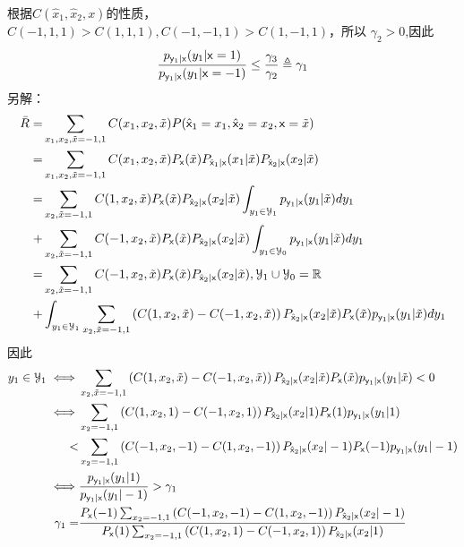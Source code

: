\documentclass[a4paper]{article}
\begin{document}
\begin{enumerate}[label=\thehwcnt.\arabic*.]
\begin{enumerate}[label=(\alph*)]
    根据$C(\hat{x}_1,\hat{x}_2,x)$的性质，
    $C(-1,1,1)>C(1,1,1),C(-1,-1,1)>C(1,-1,1)$，所以
    $\gamma_2>0$,因此
    \[
     \frac{p_{\mathsf{y}_1|\mathsf{x}}(y_1|\mathsf{x}=1)}{p_{\mathsf{y}_1|\mathsf{x}}(y_1| \mathsf{x}=-1)} \leq \frac{\gamma_3}{\gamma_2} \triangleq \gamma_1
    \]
    另解：
    \begin{align*}
      \bar{R} = & \sum_{x_1,x_2,\tilde{x}=-1,1} C(x_1,x_2,\tilde{x}) P(\hat{\mathsf{x}}_1 =x_1,\hat{\mathsf{x}}_2 = x_2 , \mathsf{x} = \tilde{x}) \\
              = & \sum_{x_1,x_2,\tilde{x}=-1,1} C(x_1,x_2,\tilde{x}) P_{\mathsf{x}}(\tilde{x})P_{\hat{\mathsf{x}}_1|\mathsf{x}}(x_1 | \tilde{x})P_{\hat{\mathsf{x}}_2|\mathsf{x}}(x_2 |\tilde{x}) \\
              = & \sum_{x_2,\tilde{x}=-1,1} C(1,x_2,\tilde{x}) P_{\mathsf{x}}(\tilde{x})P_{\hat{\mathsf{x}}_2|\mathsf{x}}(x_2 | \tilde{x})\int_{y_1\in \mathcal{Y}_1} p_{\mathsf{y}_1|\mathsf{x}}(y_1|\tilde{x})dy_1 \\
             + & \sum_{x_2,\tilde{x}=-1,1} C(-1,x_2,\tilde{x}) P_{\mathsf{x}}(\tilde{x})P_{\hat{\mathsf{x}}_2|\mathsf{x}}(x_2 | \tilde{x})\int_{y_1\in \mathcal{Y}_0} p_{\mathsf{y}_1|\mathsf{x}}(y_1|\tilde{x})dy_1 \\
              = & \sum_{x_2,\tilde{x}=-1,1} C(-1,x_2,\tilde{x}) P_{\mathsf{x}}(\tilde{x})P_{\hat{\mathsf{x}}_2|\mathsf{x}}(x_2 | \tilde{x}),\mathcal{Y}_1 \cup \mathcal{Y}_0=\mathbb{R} \\
             + &  \int_{y_1\in \mathcal{Y}_1} \sum_{x_2,\tilde{x}=-1,1}\left(C(1,x_2,\tilde{x})-C(-1,x_2,\tilde{x})\right)P_{\hat{\mathsf{x}}_2|\mathsf{x}}(x_2 | \tilde{x}) P_{\mathsf{x}}(\tilde{x})p_{\mathsf{y}_1|\mathsf{x}}(y_1|\tilde{x})dy_1 \\
    \end{align*}
    因此
\begin{align*}
y_1\in \mathcal{Y}_1 \iff & \sum_{x_2,\tilde{x}=-1,1}\left(C(1,x_2,\tilde{x})-C(-1,x_2,\tilde{x})\right)P_{\hat{\rvx}_2|\rvx}(x_2 | \tilde{x}) P_{\rvx}(\tilde{x})p_{\rvy_1|\rvx}(y_1|\tilde{x}) < 0 \\
\iff & \sum_{x_2=-1,1}\left(C(1,x_2,1)-C(-1,x_2,1)\right) P_{\hat{\rvx}_2|\rvx}(x_2 | 1)P_{\rvx}(1)p_{\rvy_1|\rvx}(y_1|1) \\
< & \sum_{x_2=-1,1}\left(C(-1,x_2,-1)-C(1,x_2,-1)\right) P_{\hat{\rvx}_2|\rvx}(x_2 | -1)P_{\rvx}(-1)p_{\rvy_1|\rvx}(y_1|-1) \\
\iff  & \frac{p_{\rvy_1|\rvx}(y_1|1)}{p_{\rvy_1|\rvx}(y_1|-1)} > \gamma_1 \\
\gamma_1 = & \frac{P_{\rvx}(-1)\sum_{x_2=-1,1}\left(C(-1,x_2,-1)-C(1,x_2,-1)\right) P_{\hat{\rvx}_2|\rvx}(x_2 | -1)}{P_{\rvx}(1)\sum_{x_2=-1,1}\left(C(1,x_2,1)-C(-1,x_2,1)\right) P_{\hat{\rvx}_2|\rvx}(x_2 | 1)}

\end{align*}
\end{enumerate}
\end{enumerate}
\end{document}
